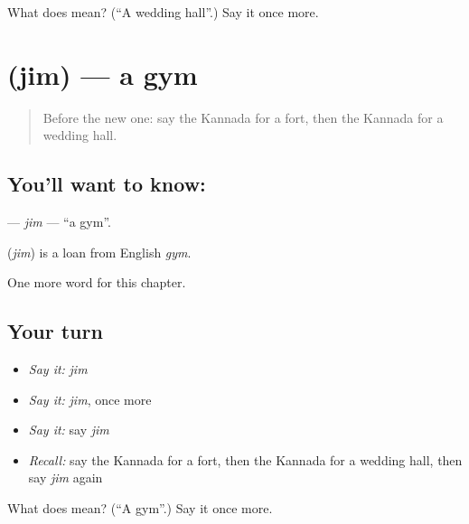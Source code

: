 \begin{tcolorbox}[breakable,colback=teal!4,colframe=teal!35!black,title={Before you move on}]
What does   mean? (\textquotedblleft{}A wedding hall\textquotedblright{}.) Say it once more.
\end{tcolorbox}
\section[\texorpdfstring{\kn{ಜಿಮ್} (jim)}{ಜಿಮ್ (jim)}]{ (jim) — a gym}

\label{lesson:KA-C213-jim}



\begin{quote}
Before the new one: say the Kannada for a fort, then the Kannada for a wedding hall.
\end{quote}

\subsection*{You'll want to know: }
\textbf{} — \emph{jim} — \textquotedblleft{}a gym\textquotedblright{}.

\begin{cousinweb}
\textbf{} (\emph{jim}) is a loan from English \emph{gym}.
\end{cousinweb}

\begin{grammarlens}[title={What you've built}]
One more word for this chapter.
\end{grammarlens}

\subsection*{Your turn}
\begin{itemize}
\raggedright
  \item \emph{Say it:} \emph{jim}
  \item \emph{Say it:} \emph{jim}, once more
  \item \emph{Say it:} say \emph{jim}
  \item \emph{Recall:} say the Kannada for a fort, then the Kannada for a wedding hall, then say \emph{jim} again
\end{itemize}

\begin{tcolorbox}[breakable,colback=teal!4,colframe=teal!35!black,title={Before you move on}]
What does  mean? (\textquotedblleft{}A gym\textquotedblright{}.) Say it once more.
\end{tcolorbox}
